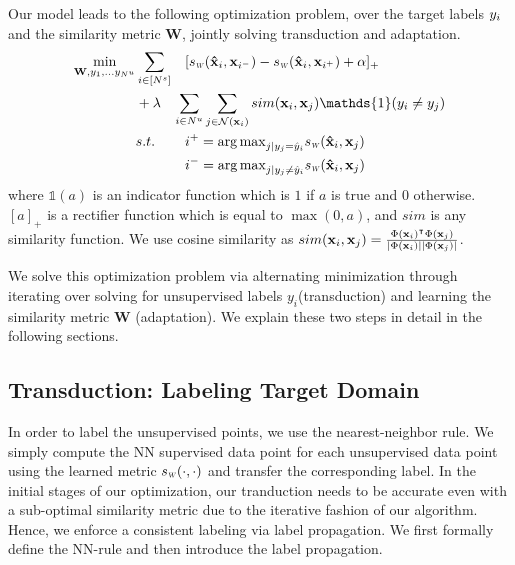 Our model leads to the following optimization problem, over the target labels $y_i$ and the similarity metric $\mathbf{W}$, jointly solving transduction and adaptation. 
\begin{equation}
\begin{aligned}
\min_{\mathbf{W}, y_1, \ldots y_{N^u}} &\sum_{i \in [N^s]} &&[\sw(\xsi,\mathbf{x}_{i^-}) - \sw(\xsi,\mathbf{x}_{i^+}) + \alpha]_{+}  \\
&+\lambda &&\hspace{-3mm}\sum_{i \in N^u} \sum_{j \in \mathcal{N}(\xui)}  sim(\xui, \xuj) \mathds{1}(y_i \neq y_j)\\
&s.t. \quad &&i^{+} = {\arg\max}_{j | y_j = \hat{y}_i} \sw(\mathbf{\hat{x}}_i,\mathbf{x}_{j}) \\
&\quad &&i^{-} = {\arg\max}_{j | y_j \neq \hat{y}_i} \sw(\mathbf{\hat{x}}_i,\mathbf{x}_{j}) 
\end{aligned}
\label{loss}
\end{equation}
where $\mathds{1}(a)$ is an indicator function which is $1$ if $a$ is true and $0$ otherwise. $[a]_+$ is a rectifier function which is equal to $\max(0, a)$, and $sim$ is any similarity function. We use cosine similarity as $sim(\mathbf{x}_i, \mathbf{x}_j)= \frac{\Phi(\mathbf{x}_i)^\intercal \Phi(\mathbf{x}_j)}{|\Phi(\mathbf{x}_i)||\Phi(\mathbf{x}_j)|}$. 

We solve this optimization problem via alternating minimization through iterating over solving for unsupervised labels $y_i$(transduction) and learning the similarity metric $\mathbf{W}$ (adaptation). We explain these two steps in detail in the following sections.



\subsection{Transduction: Labeling Target Domain}
\label{label}
In order to label the unsupervised points, we use the nearest-neighbor rule. We simply compute the NN supervised data point for each unsupervised data point using the learned metric $\sw(\cdot,\cdot)$ and transfer the corresponding label. In the initial stages of our optimization, our tranduction needs to be accurate even with a sub-optimal similarity metric due to the iterative fashion of our algorithm. Hence, we enforce a consistent labeling via label propagation. We first formally define the NN-rule and then introduce the label propagation.

